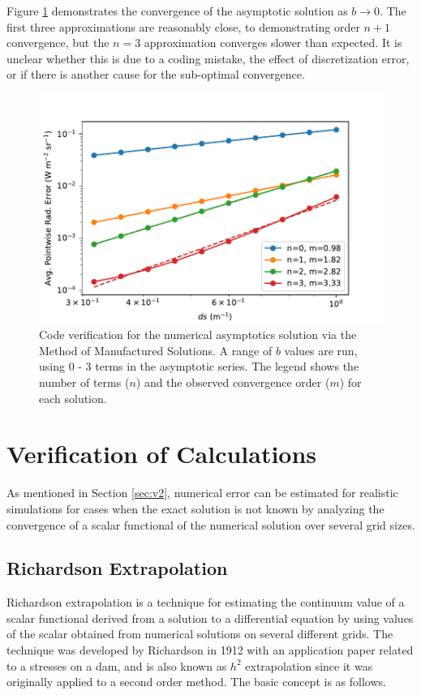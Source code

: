 \documentclass[ms,cpyr,lof,lot]{uathesis}
\begin{document}
Figure \ref{fig:mms_asym_b_conv} demonstrates the convergence of the asymptotic solution as $b \to 0$.
The first three approximations are reasonably close, to demonstrating order $n+1$ convergence, but the $n=3$ approximation converges slower than expected.
It is unclear whether this is due to a coding mistake, the effect of discretization error, or if there is another cause for the sub-optimal convergence.
\begin{figure}[h]
  \centering
  \includegraphics[width=5in]{mms_asym_b_conv}
  \caption{Code verification for the numerical asymptotics solution via the Method of Manufactured Solutions. A range of $b$ values are run, using 0 - 3 terms in the asymptotic series. The legend shows the number of terms ($n$) and the observed convergence order ($m$) for each solution.}
  \label{fig:mms_asym_b_conv}
\end{figure}

\section{Verification of Calculations}
As mentioned in Section \ref{sec:v2}, numerical error can be estimated for realistic simulations for cases when the exact solution is not known by analyzing the convergence of a scalar functional of the numerical solution over several grid sizes.

\subsection{Richardson Extrapolation}
Richardson extrapolation is a technique for estimating the continuum value of a scalar functional derived from a solution to a differential equation by using values of the scalar obtained from numerical solutions on several different grids.
The technique was developed by Richardson in 1912 with an application paper related to a stresses on a dam, and is also known as $h^2$ extrapolation since it was originally applied to a second order method.
The basic concept is as follows.
\end{document}
